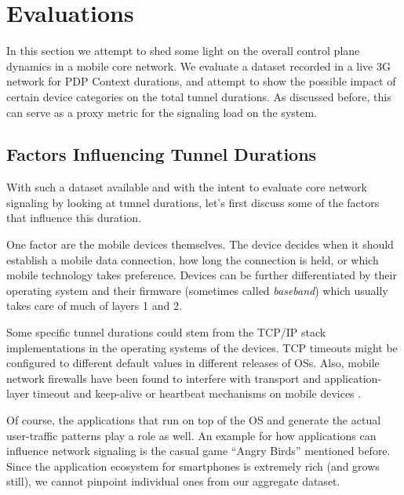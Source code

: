 \section{Evaluations}
\label{c4:evaluations}



In this section we attempt to shed some light on the overall control plane dynamics in a mobile core network. We evaluate a dataset recorded in a live 3G network for PDP Context durations, and attempt to show the possible impact of certain device categories on the total tunnel durations. As discussed before, this can serve as a proxy metric for the signaling load on the system. 




\subsection{Factors Influencing Tunnel Durations}

With such a dataset available and with the intent to evaluate core network signaling by looking at tunnel durations, let's first discuss some of the factors that influence this duration.

One factor are the mobile devices themselves. The device decides when it should establish a mobile data connection, how long the connection is held, or which mobile technology takes preference. Devices can be further differentiated by their operating system and their firmware (sometimes called \textit{baseband}) which usually takes care of much of layers 1 and 2.

Some specific tunnel durations could stem from the TCP/IP stack implementations in the operating systems of the devices. TCP timeouts might be configured to different default values in different releases of OSs. Also, mobile network firewalls have been found to interfere with transport and application-layer timeout and keep-alive or heartbeat mechanisms on mobile devices \cite{sigcomm11middleboxes}.

Of course, the applications that run on top of the OS and generate the actual user-traffic patterns play a role as well. An example for how applications can influence network signaling is the casual game ``Angry Birds'' mentioned before. Since the application ecosystem for smartphones is extremely rich (and grows still), we cannot pinpoint individual ones from our aggregate dataset.

